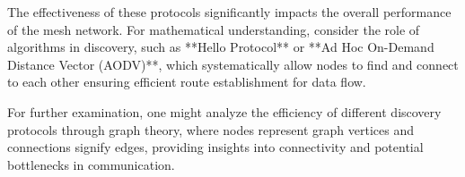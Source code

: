 The effectiveness of these protocols significantly impacts the overall performance of the mesh network. For mathematical understanding, consider the role of algorithms in discovery, such as **Hello Protocol** or **Ad Hoc On-Demand Distance Vector (AODV)**, which systematically allow nodes to find and connect to each other ensuring efficient route establishment for data flow.

For further examination, one might analyze the efficiency of different discovery protocols through graph theory, where nodes represent graph vertices and connections signify edges, providing insights into connectivity and potential bottlenecks in communication.

